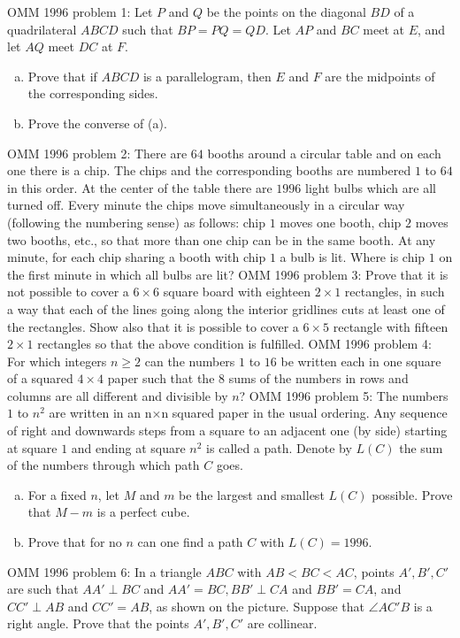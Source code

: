 OMM 1996 problem 1:  Let $P$ and $Q$ be the points on the diagonal $BD$ of a quadrilateral $ABCD$ such that $BP = PQ = QD$. Let $AP$ and $BC$ meet at $E$, and let $AQ$ meet $DC$ at $F$.
\begin{enumerate}[(a)]
  \item Prove that if $ABCD$ is a parallelogram, then $E$ and $F$ are the midpoints of the corresponding sides.
  \item Prove the converse of (a).
\end{enumerate} 
OMM 1996 problem 2:  There are $64$ booths around a circular table and on each one there is a chip. The chips and the corresponding booths are numbered $1$ to $64$ in this order. At the center of the table there are $1996$ light bulbs which are all turned off. Every minute the chips move simultaneously in a circular way (following the numbering sense) as follows: chip $1$ moves one booth, chip $2$ moves two booths, etc., so that more than one chip can be in the same booth. At any minute, for each chip sharing a booth with chip $1$ a bulb is lit. Where is chip $1$ on the first minute in which all bulbs are lit? 
OMM 1996 problem 3:  Prove that it is not possible to cover a $6\times  6$ square board with eighteen $2\times 1$ rectangles, in such a way that each of the lines going along the interior gridlines cuts at least one of the rectangles. Show also that it is possible to cover a $6\times 5$ rectangle with fifteen $2\times 1 $ rectangles so that the above condition is fulfilled. 
OMM 1996 problem 4:  For which integers $n\ge 2$ can the numbers $1$ to $16$ be written each in one square of a squared $4\times 4$ paper such that the $8$ sums of the numbers in rows and columns are all different and divisible by $n$? 
OMM 1996 problem 5:  The numbers $1$ to $n^2$ are written in an n×n squared paper in the usual ordering. Any sequence of  right and downwards steps from a square to an adjacent one (by side) starting at square $1$ and ending at square $n^2$ is called a path. Denote by $L(C)$ the sum of the numbers through which path $C$ goes.
\begin{enumerate}[(a)]
  \item For a fixed $n$, let $M$ and $m$ be the largest and smallest $L(C)$ possible. Prove that $M-m$ is a perfect cube.
  \item Prove that for no $n$ can one find a path $C$ with $L(C ) = 1996$.
\end{enumerate} 
OMM 1996 problem 6:  In a triangle $ABC$ with $AB < BC < AC$, points $A' ,B' ,C'$ are such that $AA' \perp BC$ and $AA' = BC, BB' \perp  CA$ and $BB'=CA$, and $CC' \perp AB$ and $CC'= AB$, as shown on the picture. Suppose that $\angle AC'B$ is a right angle. Prove that the points $A',B' ,C' $ are collinear. 

